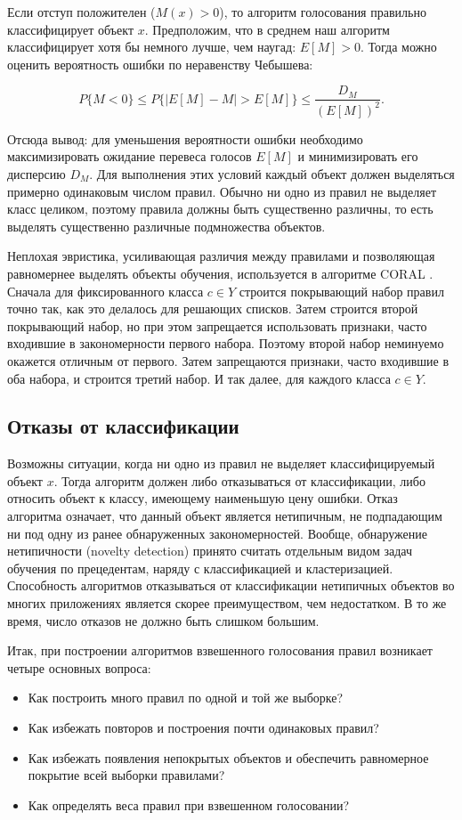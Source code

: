Если отступ положителен ($M(x) > 0$), то алгоритм голосования правильно классифицирует объект $x$. Предположим, что в среднем наш алгоритм классифицирует хотя бы немного лучше, чем наугад: $E[M] > 0$. Тогда можно оценить вероятность ошибки по неравенству Чебышева:

\[
P\{M < 0\} \leq P\{|E[M] - M| > E[M]\} \leq \frac{D_M}{(E[M])^2}.
\]

Отсюда вывод: для уменьшения вероятности ошибки необходимо максимизировать ожидание перевеса голосов $E[M]$ и минимизировать его дисперсию $D_M$. Для выполнения этих условий каждый объект должен выделяться примерно одинаковым числом правил. Обычно ни одно из правил не выделяет класс целиком, поэтому правила должны быть существенно различны, то есть выделять существенно различные подмножества объектов.

Неплохая эвристика, усиливающая различия между правилами и позволяющая равномернее выделять объекты обучения, используется в алгоритме CORAL \cite{12}. Сначала для фиксированного класса $c \in Y$ строится покрывающий набор правил точно так, как это делалось для решающих списков. Затем строится второй покрывающий набор, но при этом запрещается использовать признаки, часто входившие в закономерности первого набора. Поэтому второй набор неминуемо окажется отличным от первого. Затем запрещаются признаки, часто входившие в оба набора, и строится третий набор. И так далее, для каждого класса $c \in Y$.

\subsection{Отказы от классификации}
Возможны ситуации, когда ни одно из правил не выделяет классифицируемый объект $x$. Тогда алгоритм должен либо отказываться от классификации, либо относить объект к классу, имеющему наименьшую цену ошибки. Отказ алгоритма означает, что данный объект является нетипичным, не подпадающим ни под одну из ранее обнаруженных закономерностей. Вообще, обнаружение нетипичности (novelty detection) принято считать отдельным видом задач обучения по прецедентам, наряду с классификацией и кластеризацией. Способность алгоритмов отказываться от классификации нетипичных объектов во многих приложениях является скорее преимуществом, чем недостатком. В то же время, число отказов не должно быть слишком большим.

Итак, при построении алгоритмов взвешенного голосования правил возникает четыре основных вопроса:
\begin{itemize}
    \item Как построить много правил по одной и той же выборке?
    \item Как избежать повторов и построения почти одинаковых правил?
    \item Как избежать появления непокрытых объектов и обеспечить равномерное покрытие всей выборки правилами?
    \item Как определять веса правил при взвешенном голосовании?
\end{itemize}

